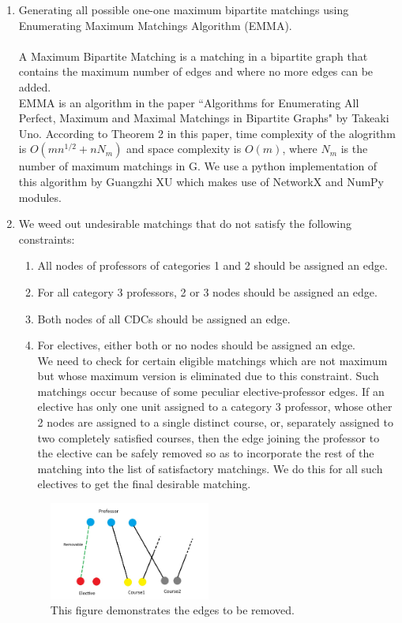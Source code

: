 \begin{enumerate}
\item Generating all possible one-one maximum bipartite matchings using Enumerating Maximum Matchings Algorithm (EMMA).
\paragraph{} A Maximum Bipartite Matching is a matching in a bipartite graph that contains the maximum number of edges and where no more edges can be added.\\
EMMA is an algorithm in the paper ``Algorithms for Enumerating All Perfect, Maximum and Maximal Matchings in Bipartite Graphs" by Takeaki Uno. According to Theorem 2 in this paper, time complexity of the alogrithm is \(O(mn^{1/2} +nN_m)\) and space complexity is \(O(m)\), where $N_m$ is the number of maximum matchings in G. We use a python implementation of this algorithm by Guangzhi XU which makes use of NetworkX and NumPy modules.

\item  We weed out undesirable matchings that do not satisfy the following constraints:
\begin{enumerate}
\item All nodes of professors of categories 1 and 2 should be assigned an edge. 
\item For all category 3 professors, 2 or 3 nodes should be assigned an edge.
\item Both nodes of all CDCs should be assigned an edge.
\item For electives, either both or no nodes should be assigned an edge.\\
We need to check for certain eligible matchings which are not maximum but whose maximum version is eliminated due to this constraint. Such matchings occur because of some peculiar elective-professor edges. If an elective has only one unit assigned to a category 3 professor, whose other 2 nodes are assigned to a single distinct course, or, separately assigned to two completely satisfied courses, then the edge joining the professor to the elective can be safely removed so as to incorporate the rest of the matching into the list of satisfactory matchings. We do this for all such electives to get the final desirable matching.
\end{enumerate}
\begin{figure}[h]
    \centering
    \caption{This figure demonstrates the edges to be removed.}
    \includegraphics[width=0.5\textwidth]{images/Remove.jpeg}
\end{figure}\\


\end{enumerate}
